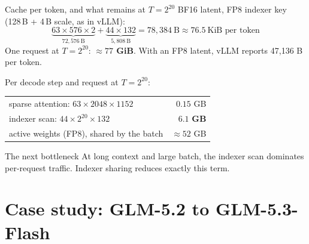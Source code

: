 \documentclass[handout]{beamer}
\begin{document}
\begin{frame}{Cache per token, and what remains at $T=2^{20}$}
  \small
  BF16 latent, FP8 indexer key (128\,B + 4\,B scale, as in vLLM):
  \[
    \underbrace{63\times576\times2}_{72{,}576\ \text{B}}
    +\underbrace{44\times132}_{5{,}808\ \text{B}}
    =78{,}384\ \text{B}\approx76.5\ \text{KiB per token}
  \]
  One request at $T=2^{20}$: \textbf{$\approx77$ GiB}. With an FP8 latent, vLLM reports 47,136 B per token.
  \par\vspace{8pt}
  Per decode step and request at $T=2^{20}$:
  \par\vspace{4pt}
  \centering
  \begin{tabular}{@{}lr@{}}
    \toprule
    sparse attention: $63\times2048\times1152$ & $0.15$ GB \\
    indexer scan: $44\times2^{20}\times132$ & $\mathbf{6.1}$ \textbf{GB} \\
    active weights (FP8), shared by the batch & $\approx52$ GB \\
    \bottomrule
  \end{tabular}
  \begin{alertblock}{The next bottleneck}
    \small At long context and large batch, the indexer scan dominates per-request traffic. Indexer sharing reduces exactly this term.
  \end{alertblock}
\end{frame}

\section{Case study: GLM-5.2 to GLM-5.3-Flash}
\end{document}
